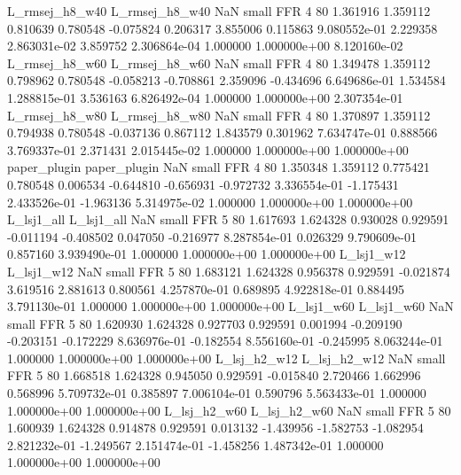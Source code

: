 L_rmsej_h8_w40 L_rmsej_h8_w40                   NaN      small      FFR                 4 80 1.361916       1.359112 0.810639       0.780548   -0.075824      0.206317      3.855006     0.115863   9.080552e-01  2.229358 2.863031e-02     3.859752   2.306864e-04            1.000000    1.000000e+00        8.120160e-02
L_rmsej_h8_w60 L_rmsej_h8_w60                   NaN      small      FFR                 4 80 1.349478       1.359112 0.798962       0.780548   -0.058213     -0.708861      2.359096    -0.434696   6.649686e-01  1.534584 1.288815e-01     3.536163   6.826492e-04            1.000000    1.000000e+00        2.307354e-01
L_rmsej_h8_w80 L_rmsej_h8_w80                   NaN      small      FFR                 4 80 1.370897       1.359112 0.794938       0.780548   -0.037136      0.867112      1.843579     0.301962   7.634747e-01  0.888566 3.769337e-01     2.371431   2.015445e-02            1.000000    1.000000e+00        1.000000e+00
  paper_plugin   paper_plugin                   NaN      small      FFR                 4 80 1.350348       1.359112 0.775421       0.780548    0.006534     -0.644810     -0.656931    -0.972732   3.336554e-01 -1.175431 2.433526e-01    -1.963136   5.314975e-02            1.000000    1.000000e+00        1.000000e+00
    L_lsj1_all     L_lsj1_all                   NaN      small      FFR                 5 80 1.617693       1.624328 0.930028       0.929591   -0.011194     -0.408502      0.047050    -0.216977   8.287854e-01  0.026329 9.790609e-01     0.857160   3.939490e-01            1.000000    1.000000e+00        1.000000e+00
    L_lsj1_w12     L_lsj1_w12                   NaN      small      FFR                 5 80 1.683121       1.624328 0.956378       0.929591   -0.021874      3.619516      2.881613     0.800561   4.257870e-01  0.689895 4.922818e-01     0.884495   3.791130e-01            1.000000    1.000000e+00        1.000000e+00
    L_lsj1_w60     L_lsj1_w60                   NaN      small      FFR                 5 80 1.620930       1.624328 0.927703       0.929591    0.001994     -0.209190     -0.203151    -0.172229   8.636976e-01 -0.182554 8.556160e-01    -0.245995   8.063244e-01            1.000000    1.000000e+00        1.000000e+00
  L_lsj_h2_w12   L_lsj_h2_w12                   NaN      small      FFR                 5 80 1.668518       1.624328 0.945050       0.929591   -0.015840      2.720466      1.662996     0.568996   5.709732e-01  0.385897 7.006104e-01     0.590796   5.563433e-01            1.000000    1.000000e+00        1.000000e+00
  L_lsj_h2_w60   L_lsj_h2_w60                   NaN      small      FFR                 5 80 1.600939       1.624328 0.914878       0.929591    0.013132     -1.439956     -1.582753    -1.082954   2.821232e-01 -1.249567 2.151474e-01    -1.458256   1.487342e-01            1.000000    1.000000e+00        1.000000e+00
